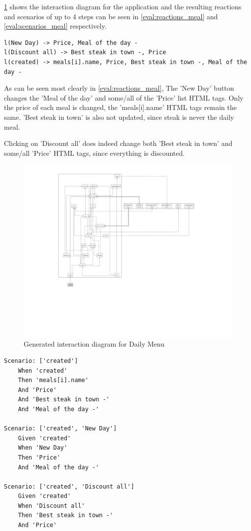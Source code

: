 \ref{fig:diagram_meal_list_properties} shows the interaction diagram for the application and the resulting reactions and scenarios of up to 4 steps can be seen in \ref{eval:reactions_meal} and \ref{eval:scenarios_meal} respectively.

\label{eval:reactions_meal}
\begin{lstlisting}
l(New Day) -> Price, Meal of the day -
l(Discount all) -> Best steak in town -, Price
l(created) -> meals[i].name, Price, Best steak in town -, Meal of the day -
\end{lstlisting}

As can be seen most clearly in \ref{eval:reactions_meal}, The 'New Day' button changes the 'Meal of the day' and some/all of the 'Price' list HTML tags. Only the price of each meal is changed, the 'meals[i].name' HTML tags remain the same. 'Best steak in town' is also not updated, since steak is never the daily meal. 

Clicking on 'Discount all' does indeed change both 'Best steak in town' and some/all 'Price' HTML tags, since everything is discounted.

\begin{figure}[H]
    \includegraphics[width=\textwidth]{images/diagram_meal.png}
     \caption{Generated interaction diagram for Daily Menu}
     \label{fig:diagram_meal_list_properties}
\end{figure}

\label{eval:scenarios_meal}
\begin{lstlisting}
Scenario: ['created']
	When 'created'
	Then 'meals[i].name'
	And 'Price'
	And 'Best steak in town -'
	And 'Meal of the day -'

Scenario: ['created', 'New Day']
	Given 'created'
	When 'New Day'
	Then 'Price'
	And 'Meal of the day -'

Scenario: ['created', 'Discount all']
	Given 'created'
	When 'Discount all'
	Then 'Best steak in town -'
	And 'Price'

\end{lstlisting}




